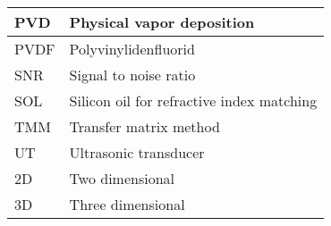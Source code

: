 \begin{center}
\begin{tabular}{|  P{3cm} | p{10cm} | }
    PVD & Physical vapor deposition \\ \hline
    PVDF & Polyvinylidenfluorid \\ \hline
    SNR & Signal to noise ratio\\ \hline
    SOL & Silicon oil for refractive index matching \\ \hline
    TMM & Transfer matrix method \\ \hline
    UT & Ultrasonic transducer \\ \hline
    2D & Two dimensional \\ \hline
    3D & Three dimensional \\ \hline  
    \end{tabular}
\end{center}